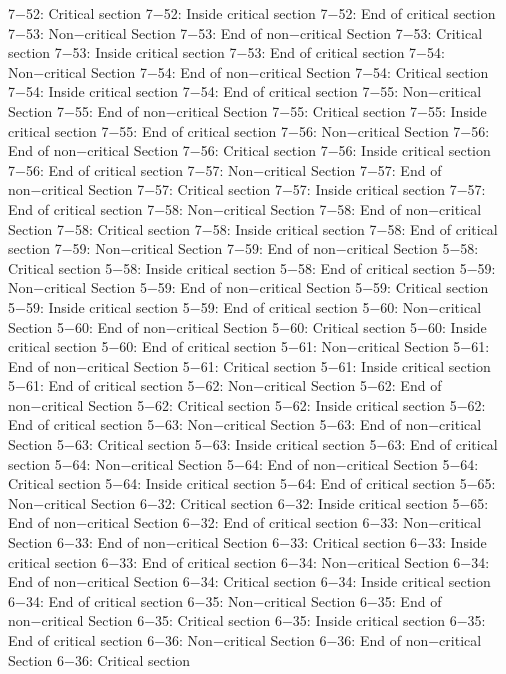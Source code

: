 7−52: Critical section
7−52: Inside critical section
7−52: End of critical section
7−53: Non−critical Section
7−53: End of non−critical Section
7−53: Critical section
7−53: Inside critical section
7−53: End of critical section
7−54: Non−critical Section
7−54: End of non−critical Section
7−54: Critical section
7−54: Inside critical section
7−54: End of critical section
7−55: Non−critical Section
7−55: End of non−critical Section
7−55: Critical section
7−55: Inside critical section
7−55: End of critical section
7−56: Non−critical Section
7−56: End of non−critical Section
7−56: Critical section
7−56: Inside critical section
7−56: End of critical section
7−57: Non−critical Section
7−57: End of non−critical Section
7−57: Critical section
7−57: Inside critical section
7−57: End of critical section
7−58: Non−critical Section
7−58: End of non−critical Section
7−58: Critical section
7−58: Inside critical section
7−58: End of critical section
7−59: Non−critical Section
7−59: End of non−critical Section
5−58: Critical section
5−58: Inside critical section
5−58: End of critical section
5−59: Non−critical Section
5−59: End of non−critical Section
5−59: Critical section
5−59: Inside critical section
5−59: End of critical section
5−60: Non−critical Section
5−60: End of non−critical Section
5−60: Critical section
5−60: Inside critical section
5−60: End of critical section
5−61: Non−critical Section
5−61: End of non−critical Section
5−61: Critical section
5−61: Inside critical section
5−61: End of critical section
5−62: Non−critical Section
5−62: End of non−critical Section
5−62: Critical section
5−62: Inside critical section
5−62: End of critical section
5−63: Non−critical Section
5−63: End of non−critical Section
5−63: Critical section
5−63: Inside critical section
5−63: End of critical section
5−64: Non−critical Section
5−64: End of non−critical Section
5−64: Critical section
5−64: Inside critical section
5−64: End of critical section
5−65: Non−critical Section
6−32: Critical section
6−32: Inside critical section
5−65: End of non−critical Section
6−32: End of critical section
6−33: Non−critical Section
6−33: End of non−critical Section
6−33: Critical section
6−33: Inside critical section
6−33: End of critical section
6−34: Non−critical Section
6−34: End of non−critical Section
6−34: Critical section
6−34: Inside critical section
6−34: End of critical section
6−35: Non−critical Section
6−35: End of non−critical Section
6−35: Critical section
6−35: Inside critical section
6−35: End of critical section
6−36: Non−critical Section
6−36: End of non−critical Section
6−36: Critical section
